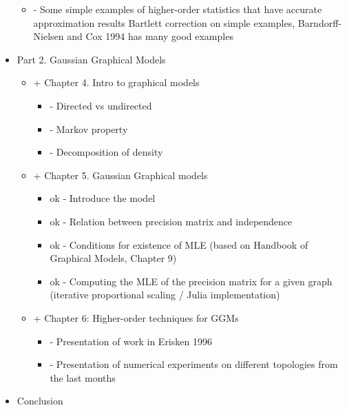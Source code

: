 \begin{itemize}
{\begin{itemize}
{\begin{itemize}
            \item {- Some simple examples of higher-order statistics that have accurate approximation results
            Bartlett correction on simple examples, Barndorff-Nielsen and Cox 1994 has many good examples}
        \end{itemize}}
\end{itemize}
}
\item{Part 2. Gaussian Graphical Models
    \begin{itemize}
        \item{\color{red} + Chapter 4. Intro to graphical models
    \begin{itemize}
        \item- Directed vs undirected
        \item- Markov property
        \item- Decomposition of density
    \end{itemize}}
    \item{\color{green} + Chapter 5. Gaussian Graphical models
    \begin{itemize}
        \item ok - Introduce the model
        \item ok - Relation between precision matrix and independence
        \item ok - Conditions for existence of MLE (based on Handbook of Graphical Models, Chapter 9)
        \item ok - Computing the MLE of the precision matrix for a given graph (iterative proportional scaling / Julia implementation)
    \end{itemize}}
    \item{\color{orange} + Chapter 6: Higher-order techniques for GGMs
    \begin{itemize}
        \item - Presentation of work in Erisken 1996
        \item - Presentation of numerical experiments on different topologies from the last months
    \end{itemize}}
\end{itemize}
}
\item \color{red} Conclusion
\end{itemize}
\newpage